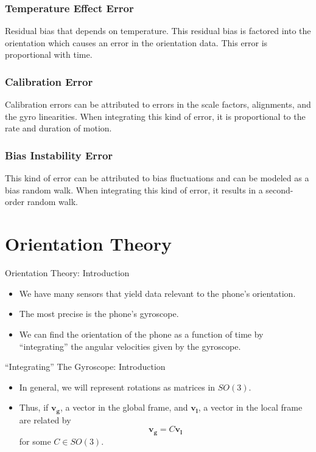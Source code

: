 \documentclass[10pt]{beamer}
\begin{document}
\begin{frame}
\frametitle{Temperature Effect Error}
Residual bias that depends on temperature. This residual bias is factored into the orientation which causes an error in the orientation data. This error is proportional with time.
\end{frame}

\begin{frame}
\frametitle{Calibration Error}
Calibration errors can be attributed to errors in the scale factors, alignments, and the gyro linearities. When integrating this kind of error, it is proportional to the rate and duration of motion.
\end{frame}

\begin{frame}
\frametitle{Bias Instability Error}
This kind of error can be attributed to bias fluctuations and can be modeled as a bias random walk. When integrating this kind of error, it results in a second-order random walk.  
\end{frame}

\section{Orientation Theory}

\begin{frame}{Orientation Theory: Introduction}
  \begin{itemize}
  \item We have many sensors that yield data relevant to the phone's orientation.
  \item The most precise is the phone's gyroscope.
  \item We can find the orientation of the phone as a function of time by ``integrating'' the angular velocities given by the gyroscope.
  \end{itemize}
\end{frame}

\begin{frame}{``Integrating'' The Gyroscope: Introduction}
  \begin{itemize}
  \item In general, we will represent rotations as matrices in \(SO(3)\).
  \item Thus, if \(\bm{v_g}\), a vector in the global frame, and \(\bm{v_l}\), a vector in the local frame are related by
    \[\bm{v_g} = C\bm{v_l}\]
    for some \(C \in SO(3)\).
  \end{itemize}
\end{frame}
\end{document}
